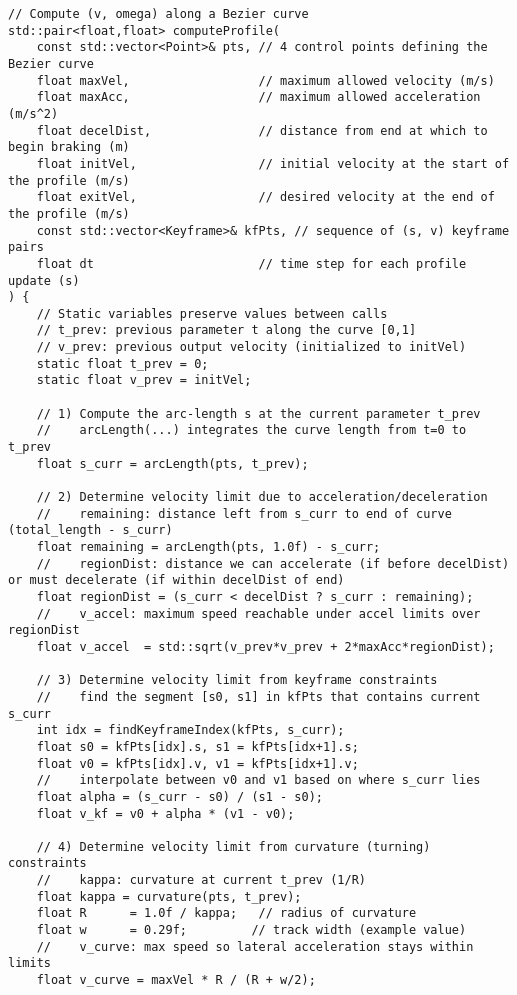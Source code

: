 \documentclass[11pt]{article}
\begin{document}
\begin{lstlisting}
// Compute (v, omega) along a Bezier curve
std::pair<float,float> computeProfile(
    const std::vector<Point>& pts, // 4 control points defining the Bezier curve
    float maxVel,                  // maximum allowed velocity (m/s)
    float maxAcc,                  // maximum allowed acceleration (m/s^2)
    float decelDist,               // distance from end at which to begin braking (m)
    float initVel,                 // initial velocity at the start of the profile (m/s)
    float exitVel,                 // desired velocity at the end of the profile (m/s)
    const std::vector<Keyframe>& kfPts, // sequence of (s, v) keyframe pairs
    float dt                       // time step for each profile update (s)
) {
    // Static variables preserve values between calls
    // t_prev: previous parameter t along the curve [0,1]
    // v_prev: previous output velocity (initialized to initVel)
    static float t_prev = 0;
    static float v_prev = initVel;

    // 1) Compute the arc-length s at the current parameter t_prev
    //    arcLength(...) integrates the curve length from t=0 to t_prev
    float s_curr = arcLength(pts, t_prev);

    // 2) Determine velocity limit due to acceleration/deceleration
    //    remaining: distance left from s_curr to end of curve (total_length - s_curr)
    float remaining = arcLength(pts, 1.0f) - s_curr;
    //    regionDist: distance we can accelerate (if before decelDist) or must decelerate (if within decelDist of end)
    float regionDist = (s_curr < decelDist ? s_curr : remaining);
    //    v_accel: maximum speed reachable under accel limits over regionDist
    float v_accel  = std::sqrt(v_prev*v_prev + 2*maxAcc*regionDist);

    // 3) Determine velocity limit from keyframe constraints
    //    find the segment [s0, s1] in kfPts that contains current s_curr
    int idx = findKeyframeIndex(kfPts, s_curr);
    float s0 = kfPts[idx].s, s1 = kfPts[idx+1].s;
    float v0 = kfPts[idx].v, v1 = kfPts[idx+1].v;
    //    interpolate between v0 and v1 based on where s_curr lies
    float alpha = (s_curr - s0) / (s1 - s0);
    float v_kf = v0 + alpha * (v1 - v0);

    // 4) Determine velocity limit from curvature (turning) constraints
    //    kappa: curvature at current t_prev (1/R)
    float kappa = curvature(pts, t_prev);
    float R      = 1.0f / kappa;   // radius of curvature
    float w      = 0.29f;         // track width (example value)
    //    v_curve: max speed so lateral acceleration stays within limits
    float v_curve = maxVel * R / (R + w/2);


\end{lstlisting}
\end{document}
